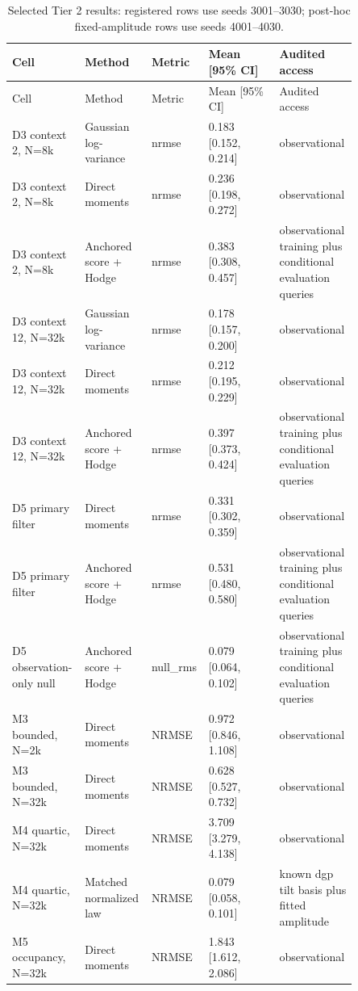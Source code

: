 \begin{longtable}{p{0.17\linewidth}p{0.18\linewidth}p{0.08\linewidth}p{0.20\linewidth}p{0.22\linewidth}}
\caption{Selected Tier 2 results: registered rows use seeds 3001--3030; post-hoc fixed-amplitude rows use seeds 4001--4030.}\\
\toprule Cell & Method & Metric & Mean [95\% CI] & Audited access\\\midrule
\endfirsthead\toprule Cell & Method & Metric & Mean [95\% CI] & Audited access\\\midrule\endhead
D3 context 2, N=8k & Gaussian log-variance & nrmse & 0.183 [0.152, 0.214] & observational \\
D3 context 2, N=8k & Direct moments & nrmse & 0.236 [0.198, 0.272] & observational \\
D3 context 2, N=8k & Anchored score + Hodge & nrmse & 0.383 [0.308, 0.457] & observational training plus conditional evaluation queries \\
D3 context 12, N=32k & Gaussian log-variance & nrmse & 0.178 [0.157, 0.200] & observational \\
D3 context 12, N=32k & Direct moments & nrmse & 0.212 [0.195, 0.229] & observational \\
D3 context 12, N=32k & Anchored score + Hodge & nrmse & 0.397 [0.373, 0.424] & observational training plus conditional evaluation queries \\
D5 primary filter & Direct moments & nrmse & 0.331 [0.302, 0.359] & observational \\
D5 primary filter & Anchored score + Hodge & nrmse & 0.531 [0.480, 0.580] & observational training plus conditional evaluation queries \\
D5 observation-only null & Anchored score + Hodge & null\_rms & 0.079 [0.064, 0.102] & observational training plus conditional evaluation queries \\
M3 bounded, N=2k & Direct moments & NRMSE & 0.972 [0.846, 1.108] & observational \\
M3 bounded, N=32k & Direct moments & NRMSE & 0.628 [0.527, 0.732] & observational \\
M4 quartic, N=32k & Direct moments & NRMSE & 3.709 [3.279, 4.138] & observational \\
M4 quartic, N=32k & Matched normalized law & NRMSE & 0.079 [0.058, 0.101] & known dgp tilt basis plus fitted amplitude \\
M5 occupancy, N=32k & Direct moments & NRMSE & 1.843 [1.612, 2.086] & observational \\

\end{longtable}
